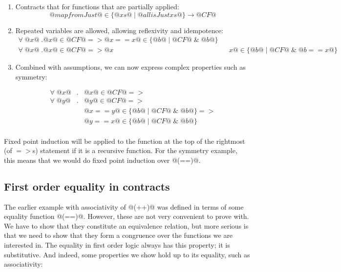 \begin{enumerate}
  \item Contracts that for functions that are partially applied:
    $$@map fromJust@ \in \{ @xs@ \mid @all isJust xs@ \} \to @CF@$$

  \item Repeated variables are allowed, allowing reflexivity and
    idempotence:
    \[\begin{array}{l}
    \forall \; @x@ \; . @x@ \in @CF@ => @x == x@ \in \{ @b@ \mid @CF@ \; \& \; @b@ \} \\
    \forall \; @x@ \; . @x@ \in @CF@ => @x && x@ \in \{ @b@ \mid @CF@ \; \& \; @b == x@ \}
    \end{array}\]

  \item Combined with assumptions, we can now express complex
      properties such as symmetry:

    \[\begin{array}{rcl}
    \forall \; @x@ & . & @x@ \in @CF@ => \\
    \forall \; @y@ & . & @y@ \in @CF@ => \\
                   &   & @x == y@ \in \{ @b@ \mid @CF@ \; \& \; @b@ \} => \\
                   &   & @y == x@ \in \{ @b@ \mid @CF@ \; \& \; @b@ \}    \\
    \end{array}\]

\end{enumerate}

Fixed point induction will be applied to the function at the top of
the rightmost (of $=>$s) statement if it is a recursive function. For
the symmetry example, this means that we would do fixed point induction
over @(==)@.

\subsection{First order equality in contracts}

The earlier example with associativity of @(++)@ was defined in terms
of some equality function @(==)@. However, these are not very
convenient to prove with. We have to show that they constitute an
equivalence relation, but more serious is that we need to show that
they form a congruence over the functions we are interested in. The
equality in first order logic always has this property; it is
substitutive. And indeed, some properties we show hold up to its
equality, such as associativity:

